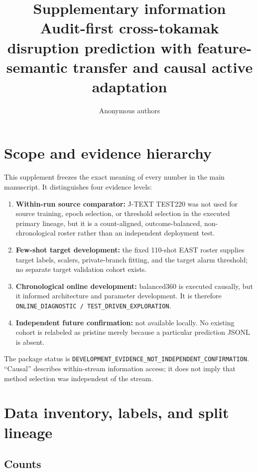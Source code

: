 \documentclass[10pt]{article}
\title{Supplementary information\\Audit-first cross-tokamak disruption prediction with feature-semantic transfer and causal active adaptation}
\author{Anonymous authors}
\date{}
\newcommand{\jtext}{J-TEXT}
\newcommand{\east}{EAST}
\newcommand{\code}[1]{\nolinkurl{#1}}
\begin{document}
\maketitle

\section{Scope and evidence hierarchy}

This supplement freezes the exact meaning of every number in the main manuscript.  It distinguishes four evidence levels:

\begin{enumerate}
  \item \textbf{Within-run source comparator:} \jtext{} TEST220 was not used for source training, epoch selection, or threshold selection in the executed primary lineage, but it is a count-aligned, outcome-balanced, non-chronological roster rather than an independent deployment test.
  \item \textbf{Few-shot target development:} the fixed 110-shot \east{} roster supplies target labels, scalers, private-branch fitting, and the target alarm threshold; no separate target validation cohort exists.
  \item \textbf{Chronological online development:} balanced360 is executed causally, but it informed architecture and parameter development.  It is therefore \code{ONLINE_DIAGNOSTIC / TEST_DRIVEN_EXPLORATION}.
  \item \textbf{Independent future confirmation:} not available locally.  No existing cohort is relabeled as pristine merely because a particular prediction JSONL is absent.
\end{enumerate}

The package status is \code{DEVELOPMENT_EVIDENCE_NOT_INDEPENDENT_CONFIRMATION}.  ``Causal'' describes within-stream information access; it does not imply that method selection was independent of the stream.

\section{Data inventory, labels, and split lineage}

\subsection{Counts}
\end{document}

